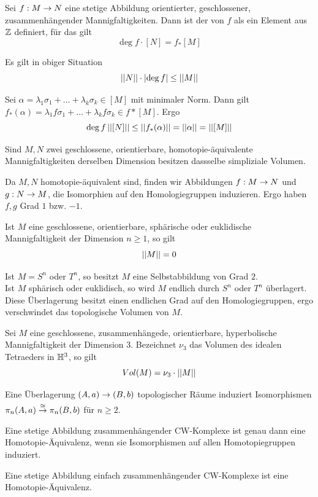 \documentclass{book}
\begin{document}
\Def{}
Sei $f : M \overset{}{\rightarrow} N$ eine stetige Abbildung orientierter, geschlossener, zusammenhängender Mannigfaltigkeiten. Dann ist der  von $f$ als ein Element aus $\mathbb{Z}$ definiert, für das gilt
\[ \deg f \cdot [N] = f_*[M] \]

\Prop{}
Es gilt in obiger Situation
\[ \left|\left|N\right|\right| \cdot \left|\deg f\right| \leq \left|\left|M\right|\right| \]
\begin{Beweis}{}
	Sei $\alpha = \lambda_1 \sigma_1 + \ldots + \lambda_k \sigma_k \in [M]$ mit minimaler Norm. Dann gilt $f_*(\alpha)= \lambda_1 f\sigma_1 + \ldots + \lambda_k f\sigma_k \in f*[M]$. Ergo
	\[ \deg f\left|\left|[N]\right|\right| \leq \left|\left|f_*(\alpha)\right|\right| = \left|\left|\alpha\right|\right| = \left|\left|[M]\right|\right| \]
\end{Beweis}

\Kor{}
Sind $M,N$ zwei geschlossene, orientierbare, homotopie-äquivalente Mannigfaltigkeiten derselben Dimension besitzen dassselbe simpliziale Volumen.
\begin{Beweis}{}
	Da $M,N$ homotopie-äquivalent sind, finden wir Abbildungen $f : M\overset{}{\rightarrow} N$ und $g : N \overset{}{\rightarrow} M$, die Isomorphien auf den Homologiegruppen induzieren. Ergo haben $f,g$ Grad $1$ bzw. $-1$.
\end{Beweis}

\Kor{}
Ist $M$ eine geschlossene, orientierbare, sphärische oder euklidische Mannigfaltigkeit der Dimension $n\geq 1$, so gilt
\[ \left|\left|M\right|\right| = 0 \]
\begin{Beweis}{}
	Ist $M = S^n$ oder $T^n$, so besitzt $M$ eine Selbstabbildung von Grad $2$.\\
	Ist $M$ sphärisch oder euklidisch, so wird $M$ endlich durch $S^n$ oder $T^n$ überlagert. Diese Überlagerung besitzt einen endlichen Grad auf den Homologiegruppen, ergo verschwindet das topologische Volumen von $M$.
\end{Beweis}

\Satz{}
Sei $M$ eine geschlossene, zusammenhängede, orientierbare, hyperbolische Mannigfaltigkeit der Dimension 3. Bezeichnet $\nu_3$ das Volumen des idealen Tetraeders in $\mathbb{H}^3$, so gilt
\[ Vol(M) = \nu_3 \cdot \left|\left|M\right|\right| \]

\Prop{}
Eine Überlagerung $(A,a) \overset{}{\rightarrow} (B,b)$ topologischer Räume induziert Isomorphismen $\pi_n(A,a) \overset{\overset{}{\cong}}{\rightarrow} \pi_n(B,b)$ für $n\geq 2$.

Eine stetige Abbildung zusammenhängender CW-Komplexe ist genau dann eine Homotopie-Äquivalenz, wenn sie Isomorphismen auf allen Homotopiegruppen induziert.

Eine stetige Abbildung einfach zusammenhängender CW-Komplexe ist eine Homotopie-Äquivalenz.
\end{document}
